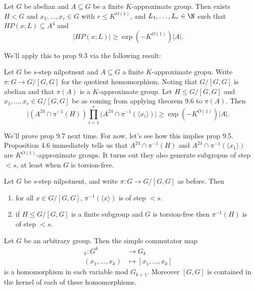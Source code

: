 \documentclass[a4paper]{article}
\begin{document}
\begin{theorem}
  Let \(G\) be abelian and \(A \subseteq G\) be a finite \(K\)-approximate group. Then exists \(H < G\) and \(x_1, \dots, x_r \in G\) with \(r \leq K^{O(1)}\), and \(L_1, \dots, L_r \in \N\) such that \(H P(x; L) \subseteq A^4\) and
  \[
    |H P(x; L)| \geq \exp (-K^{O(1)}) |A|.
  \]
\end{theorem}

We'll apply this to prop 9.3 via the following result:

\begin{proposition}[proposition 9.7]
  Let \(G\) be \(s\)-step nilpotnent and \(A \subseteq G\) a finite \(K\)-approximate gropu. Write \(\pi: G \to G/[G, G]\) for the quotient homomorphism. Noting that \(G/[G, G]\) is abelian and that \(\pi(A)\) is a \(K\)-approximate group. Let \(H \leq G/[G, G]\) and \(x_1, \dots, x_r \in G/[G, G]\) be as coming from applying theorem 9.6 to \(\pi(A)\). Then
  \[
    \Big| (A^{24} \cap \pi^{-1}(H)) \prod_{i = 1}^r (A^{24} \cap \pi^{-1}(\langle x_i \rangle) \Big|
    \geq \exp(-K^{O(1)}) |A|.
  \]
\end{proposition}

We'll prove prop 9.7 next time. For now, let's see how this implies prop 9.5. Proposition 4.6 immediately tells us that \(A^{24} \cap \pi^{-1}(H)\) and \(A^{24} \cap \pi^{-1}( \langle x_1 \rangle)\) are \(K^{O(1)}\)-approximate groups. It turns out they also generate subgropus of step \(< s\), at least when \(G\) is torsion-free.

\begin{lemma}[lemma 9.8]
  Let \(G\) be \(s\)-step nilpotnent, and write \(\pi: G \to G/[G, G]\) as before. Then
  \begin{enumerate}
  \item for all \(x \in G/[G, G]\), \(\pi^{-1}(\langle x \rangle)\) is of step \(< s\).
  \item if \(H \leq G/[G, G]\) is a finite subgroup and \(G\) is torsion-free then \(\pi^{-1}(H)\) is of step \(< s\).
  \end{enumerate}
\end{lemma}

\begin{lemma}[lemma 9.9]
  Let \(G\) be an arbitrary group. Then the simple commutator map
  \begin{align*}
    [\cdot, \cdots, \cdot]_k: G^k &\to G_k \\
    (x_1, \dots, x_k) &\mapsto [x_1, \dots, x_k]
  \end{align*}
  is a homomorphism in each variable mod \(G_{k + 1}\). Moreover \([G, G]\) is contained in the kernel of each of these homomorphisms.
\end{lemma}













\printindex
\end{document}
